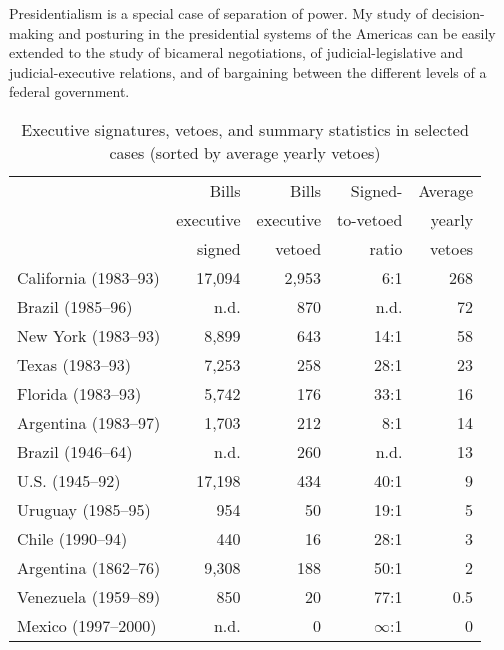 Presidentialism is a special case of separation of power.  My study of decision-making and posturing in the presidential systems of the Americas can be easily extended to the study of bicameral negotiations, of judicial-legislative and judicial-executive relations, and of bargaining between the different levels of a federal government. 

\begin{table}
\begin{tabular}{lrrrr}
                      & Bills           & Bills           &  Signed-        & Average        \\
                      & executive       & executive       &  to-vetoed      & yearly         \\
                      & signed          & vetoed          &  ratio          & vetoes         \\ \hline
California (1983--93) &  17,094         &  2,953          &   6:1           & 268            \\
Brazil (1985--96)     &    n.d.         &    870          &  n.d.           &  72            \\
New York (1983--93)   &   8,899         &    643          &  14:1           &  58            \\
Texas (1983--93)      &   7,253         &    258          &  28:1           &  23            \\
Florida (1983--93)    &   5,742         &    176          &  33:1           &  16            \\
Argentina (1983--97)  &   1,703         &    212          &   8:1           &  14            \\
Brazil (1946--64)     &    n.d.         &    260          &  n.d.           &  13            \\
U.S. (1945--92)       &  17,198         &    434          &  40:1           &   9            \\
Uruguay (1985--95)    &     954         &     50          &  19:1           &   5            \\
Chile (1990--94)      &     440         &     16          &  28:1           &   3            \\
Argentina (1862--76)  &   9,308         &    188          &  50:1           &   2            \\
Venezuela (1959--89)  &     850         &     20          &  77:1           & 0.5            \\
Mexico (1997--2000)   &    n.d.         &      0          &  $\infty$:1     &   0            \\
\end{tabular}
\caption{Executive signatures, vetoes, and summary statistics in selected cases (sorted by average yearly vetoes)}\label{t:aggVetoStats}
\end{table}

